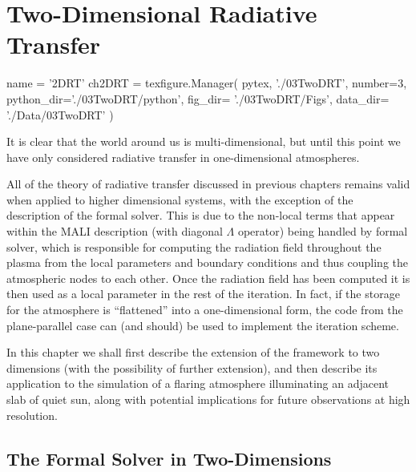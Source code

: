 \chapter{Two-Dimensional Radiative Transfer}
\begin{pycode}[2DRT]
name = '2DRT'
ch2DRT = texfigure.Manager(
    pytex,
    './03TwoDRT',
    number=3,
    python_dir='./03TwoDRT/python',
    fig_dir=   './03TwoDRT/Figs',
    data_dir=  './Data/03TwoDRT'
)
\end{pycode}


It is clear that the world around us is multi-dimensional, but until this point we have only considered radiative transfer in one-dimensional atmospheres.

All of the theory of radiative transfer discussed in previous chapters remains valid when applied to higher dimensional systems, with the exception of the description of the formal solver.
This is due to the non-local terms that appear within the MALI description (with diagonal $\Lambda$ operator) being handled by formal solver, which is responsible for computing the radiation field throughout the plasma from the local parameters and boundary conditions and thus coupling the atmospheric nodes to each other.
Once the radiation field has been computed it is then used as a local parameter in the rest of the iteration.
In fact, if the storage for the atmosphere is ``flattened'' into a one-dimensional form, the code from the plane-parallel case can (and should) be used to implement the iteration scheme.

In this chapter we shall first describe the extension of the \Lw{} framework to two dimensions (with the possibility of further extension), and then describe its application to the simulation of a flaring atmosphere illuminating an adjacent slab of quiet sun, along with potential implications for future observations at high resolution.

\section{The Formal Solver in Two-Dimensions}

